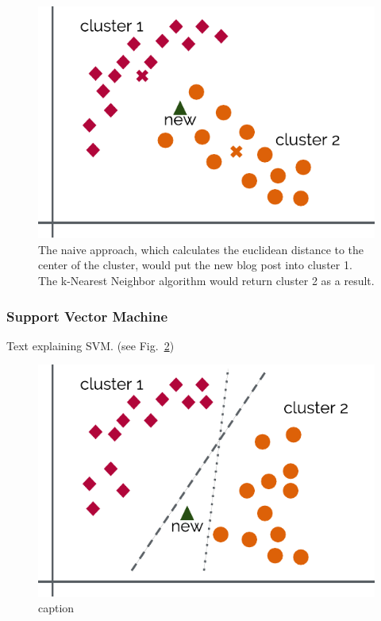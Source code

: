 \begin{figure}
    \centering
    \includegraphics[]{images/naive.pdf}
    \caption{The naive approach, which calculates the euclidean distance to the center of the cluster, would put the new blog post into cluster 1. The k-Nearest Neighbor algorithm would return cluster 2 as a result.}
    \label{fig:naive}
\end{figure}


\subsubsection{Support Vector Machine}
\label{sec:support_vector_machine}


Text explaining SVM. (see Fig.~\ref{fig:svm})


\begin{figure}
    \centering
    \includegraphics[]{images/svm.pdf}
    \caption{caption}
    \label{fig:svm}
\end{figure}
